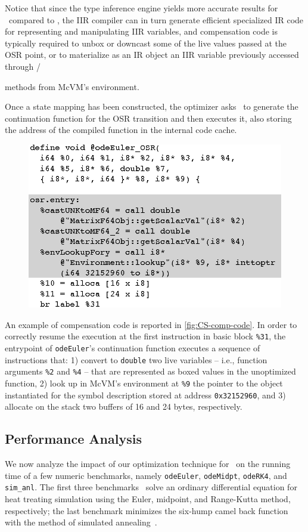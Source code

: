 Notice that since the type inference engine yields more accurate results for \fOptIIR\ compared to \fIIR, the IIR compiler can in turn generate efficient specialized IR code for representing and manipulating IIR variables, and compensation code is typically required to unbox or downcast some of the live values passed at the OSR point, or to materialize as an IR object an IIR variable previously accessed through /{ methods from McVM's environment.

Once a state mapping has been constructed, the optimizer asks \osrkit\ to generate the continuation function for the OSR transition and then executes it, also storing the address of the compiled function in the internal code cache.

\ifdefined\noauthorea
\begin{figure}[!ht]
\begin{center}
\includegraphics[width=0.7\columnwidth]{figures/CS-comp-code/CS-comp-code.eps}
\caption{\protect}
\end{center}
\end{figure}
\fi

\noindent An example of compensation code is reported in \myfigure\ref{fig:CS-comp-code}. In order to correctly resume the execution at the first instruction in basic block {\tt \%31}, the entrypoint of {\tt odeEuler}'s continuation function executes a sequence of instructions that: 1) convert to {\tt double} two live variables -- i.e., function arguments {\tt \%2} and {\tt \%4} -- that are represented as boxed values in the unoptimized function, 2) look up in McVM's environment at {\tt \%9} the pointer to the object instantiated for the symbol description stored at address {\tt 0x32152960}, and 3) allocate on the stack two buffers of 16 and 24 bytes, respectively.

\subsection{Performance Analysis}
We now analyze the impact of our optimization technique for \feval\ on the running time of a few numeric benchmarks, namely {\tt odeEuler}, {\tt odeMidpt}, {\tt odeRK4}, and {\tt sim\_anl}. The first three benchmarks~\cite{Recktenwald2000} solve an ordinary differential equation for heat treating simulation using the Euler, midpoint, and Range-Kutta method, respectively; the last benchmark minimizes the six-hump camel back function with the method of simulated annealing~\cite{simanl}.

}
